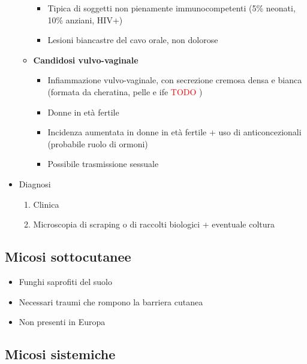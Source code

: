 \documentclass[italian,]{article}
\providecommand{\tightlist}{%
  \setlength{\itemsep}{0pt}\setlength{\parskip}{0pt}}
\newcommand{\TODO}[1]{\textcolor{red}{\textsf{\footnotesize{TODO #1}}}} %
\begin{document}
\begin{itemize}
\begin{itemize}
    \begin{itemize}
    \tightlist
    \item
      Tipica di soggetti non pienamente immunocompetenti (5\% neonati,
      10\% anziani, HIV+)
    \item
      Lesioni biancastre del cavo orale, non dolorose
    \end{itemize}
  \item
    \textbf{Candidosi vulvo-vaginale}

    \begin{itemize}
    \tightlist
    \item
      Infiammazione vulvo-vaginale, con secrezione cremosa densa e
      bianca (formata da cheratina, pelle e ife \TODO{})
    \item
      Donne in età fertile
    \item
      Incidenza aumentata in donne in età fertile + uso di
      anticoncezionali (probabile ruolo di ormoni)
    \item
      Possibile trasmissione sessuale
    \end{itemize}
  \end{itemize}
\item
  Diagnosi

  \begin{enumerate}
  \def\labelenumi{\arabic{enumi}.}
  \tightlist
  \item
    Clinica
  \item
    Microscopia di scraping o di raccolti biologici + eventuale coltura
  \end{enumerate}
\end{itemize}

\hypertarget{micosi-sottocutanee}{%
\subsection{Micosi sottocutanee}\label{micosi-sottocutanee}}

\begin{itemize}
\tightlist
\item
  Funghi saprofiti del suolo
\item
  Necessari traumi che rompono la barriera cutanea
\item
  Non presenti in Europa
\end{itemize}

\hypertarget{micosi-sistemiche}{%
\subsection{Micosi sistemiche}\label{micosi-sistemiche}}
\end{document}
